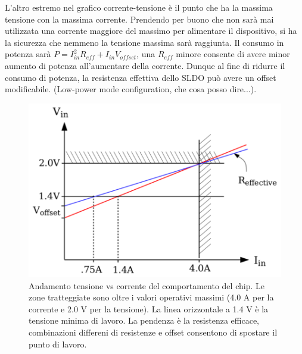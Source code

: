 L'altro estremo nel grafico corrente-tensione è il punto che ha la massima tensione con la massima corrente. Prendendo per buono che non sarà mai utilizzata una corrente maggiore del massimo per alimentare il dispositivo, si ha la sicurezza che nemmeno la tensione massima sarà raggiunta. 
Il consumo in potenza sarà $P=I_{in}^2R_{eff}+I_{in}V_{offset}$, una $R_{eff}$ minore consente di avere minor aumento di potenza all'aumentare della corrente. %
 Dunque al fine di ridurre il consumo di potenza, la resistenza effettiva dello SLDO può avere un offset modificabile. (Low-power mode configuration, che cosa posso dire...).

\begin{figure}
\centering
\includegraphics[scale=.3]{Immagini/VoltageVsCurrent}
\caption{Andamento tensione vs corrente del comportamento del chip. Le zone tratteggiate sono oltre i valori operativi massimi (4.0 A per la corrente e 2.0 V per la tensione). La linea orizzontale a 1.4 V è la tensione minima di lavoro. La pendenza è la resistenza efficace, combinazioni differeni di resistenze e offset consentono di spostare il punto di lavoro.}
\label{VVC}
\end{figure}

